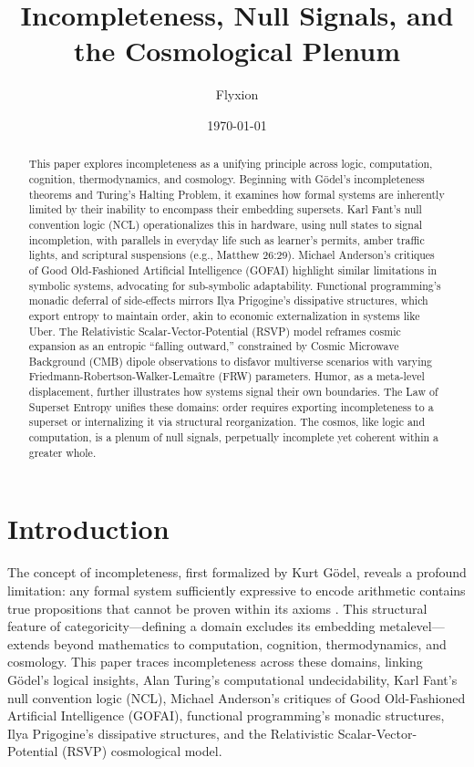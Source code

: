 \documentclass{article}
\begin{document}
\title{Incompleteness, Null Signals, and the Cosmological Plenum}
\author{Flyxion}
\date{\today}
\maketitle

\begin{abstract}
This paper explores incompleteness as a unifying principle across logic, computation, cognition, thermodynamics, and cosmology. Beginning with G\"{o}del's incompleteness theorems and Turing's Halting Problem, it examines how formal systems are inherently limited by their inability to encompass their embedding supersets. Karl Fant's null convention logic (NCL) operationalizes this in hardware, using null states to signal incompletion, with parallels in everyday life such as learner's permits, amber traffic lights, and scriptural suspensions (e.g., Matthew 26:29). Michael Anderson's critiques of Good Old-Fashioned Artificial Intelligence (GOFAI) highlight similar limitations in symbolic systems, advocating for sub-symbolic adaptability. Functional programming's monadic deferral of side-effects mirrors Ilya Prigogine's dissipative structures, which export entropy to maintain order, akin to economic externalization in systems like Uber. The Relativistic Scalar-Vector-Potential (RSVP) model reframes cosmic expansion as an entropic ``falling outward,'' constrained by Cosmic Microwave Background (CMB) dipole observations to disfavor multiverse scenarios with varying Friedmann-Robertson-Walker-Lema\^{i}tre (FRW) parameters. Humor, as a meta-level displacement, further illustrates how systems signal their own boundaries. The Law of Superset Entropy unifies these domains: order requires exporting incompleteness to a superset or internalizing it via structural reorganization. The cosmos, like logic and computation, is a plenum of null signals, perpetually incomplete yet coherent within a greater whole.
\end{abstract}

\section{Introduction}
\label{sec:intro}
The concept of incompleteness, first formalized by Kurt G\"{o}del, reveals a profound limitation: any formal system sufficiently expressive to encode arithmetic contains true propositions that cannot be proven within its axioms \citep{godel1931}. This structural feature of categoricity---defining a domain excludes its embedding metalevel---extends beyond mathematics to computation, cognition, thermodynamics, and cosmology. This paper traces incompleteness across these domains, linking G\"{o}del's logical insights, Alan Turing's computational undecidability, Karl Fant's null convention logic (NCL), Michael Anderson's critiques of Good Old-Fashioned Artificial Intelligence (GOFAI), functional programming's monadic structures, Ilya Prigogine's dissipative structures, and the Relativistic Scalar-Vector-Potential (RSVP) cosmological model.
\end{document}
